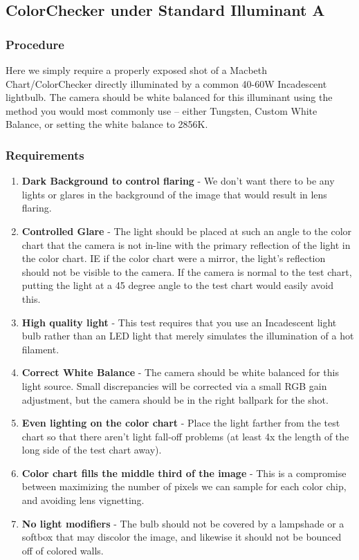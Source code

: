 \documentclass[twoside]{article}
\begin{document}
\subsection{ColorChecker under Standard Illuminant A}\label{chartA}

\subsubsection{Procedure}
Here we simply require a properly exposed shot of a Macbeth Chart/ColorChecker directly illuminated by a common 40-60W Incadescent lightbulb. The camera should be white balanced for this illuminant using the method you would most commonly use -- either Tungsten, Custom White Balance, or setting the white balance to 2856K.

\subsubsection{Requirements}
\begin{enumerate}
    \item \textbf{Dark Background to control flaring} - We don't want there to be any lights or glares in the background of the image that would result in lens flaring.
    \item \textbf{Controlled Glare} - The light should be placed at such an angle to the color chart that the camera is not in-line with the primary reflection of the light in the color chart. IE if the color chart were a mirror, the light's reflection should not be visible to the camera. If the camera is normal to the test chart, putting the light at a 45 degree angle to the test chart would easily avoid this.
    \item \textbf{High quality light} - This test requires that you use an Incadescent light bulb rather than an LED light that merely simulates the illumination of a hot filament.
    \item \textbf{Correct White Balance} - The camera should be white balanced for this light source. Small discrepancies will be corrected via a small RGB gain adjustment, but the camera should be in the right ballpark for the shot.
    \item \textbf{Even lighting on the color chart} - Place the light farther from the test chart so that there aren't light fall-off problems (at least 4x the length of the long side of the test chart away).
    \item \textbf{Color chart fills the middle third of the image} - This is a compromise between maximizing the number of pixels we can sample for each color chip, and avoiding lens vignetting.
    \item \textbf{No light modifiers} - The bulb should not be covered by a lampshade or a softbox that may discolor the image, and likewise it should not be bounced off of colored walls.
\end{enumerate}
\end{document}
